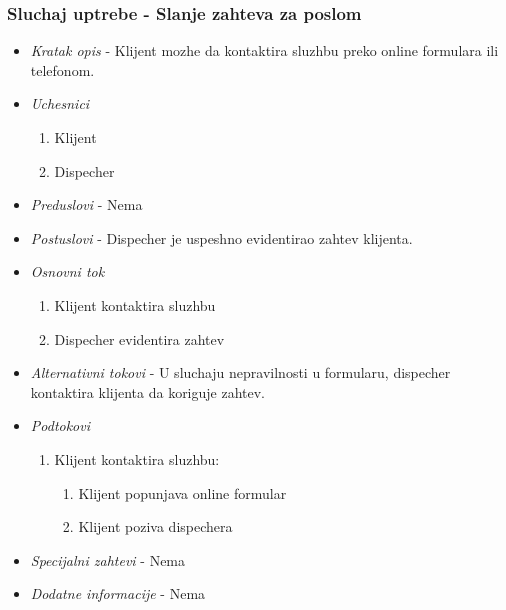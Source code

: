 \documentclass[10 pt]{article}
\begin{document}
	\subsubsection{Sluchaj uptrebe - Slanje zahteva za poslom}
		\begin{itemize}
			
			\item \textit{Kratak opis} - Klijent mozhe da kontaktira sluzhbu preko online formulara ili telefonom.
			
			\item \textit{Uchesnici}
				\begin{enumerate}
					\item Klijent
					\item Dispecher
				\end{enumerate}
			
			\item \textit{Preduslovi} - Nema
			
			\item \textit{Postuslovi} - Dispecher je uspeshno evidentirao zahtev klijenta.
			
			\item \textit{Osnovni tok}
				\begin{enumerate}
					\item Klijent kontaktira sluzhbu
					\item Dispecher evidentira zahtev
				\end{enumerate}
			
			\item \textit{Alternativni tokovi} - U sluchaju nepravilnosti u formularu, dispecher kontaktira klijenta da koriguje zahtev.
			
			\item \textit{Podtokovi} 
				\begin{enumerate}
					\item Klijent kontaktira sluzhbu: 
					\begin{enumerate}
						\item Klijent popunjava online formular
						\item Klijent poziva dispechera
					\end{enumerate}
				\end{enumerate}
			
			\item \textit{Specijalni zahtevi} - Nema
			
			\item \textit{Dodatne informacije} - Nema
			
		\end{itemize}
		
\end{document}
